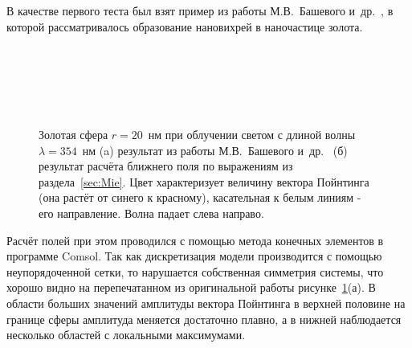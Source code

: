 В качестве первого теста был взят пример из работы М.В.~Башевого
и~др.~\cite{Bashevoy-2005}, в которой рассматривалось образование
нановихрей в наночастице золота. 
\begin{figure}[p]
  \begin{minipage}[ht]{0.99\linewidth}
  \end{minipage}\\
  \vfill
  \begin{minipage}[ht]{0.99\linewidth}
  \end{minipage}\\
  \vfill
  \begin{minipage}[ht]{0.99\linewidth}
  \end{minipage}\\
  \begin{minipage}[ht]{0.99\linewidth}
  \end{minipage}
  \caption{Золотая сфера $r=20$~нм при облучении светом с длиной волны
    $\lambda=354$~нм (a) результат из работы М.В.~Башевого
    и~др.~\cite{Bashevoy-2005} (б) результат расчёта ближнего поля по
    выражениям из раздела~\ref{sec:Mie}. Цвет характеризует величину
    вектора Пойнтинга (она растёт от синего к красному), касательная к
    белым линиям - его направление. Волна падает слева
    направо.\label{img:vortex}}
\end{figure}
Расчёт полей при этом проводился с помощью метода конечных элементов в
программе Comsol. Так как дискретизация модели производится с помощью
неупорядоченной сетки, то нарушается собственная симметрия системы,
что хорошо видно на перепечатанном из оригинальной работы
рисунке~\ref{img:vortex}(а).  В области больших значений амплитуды
вектора Пойнтинга в верхней половине на границе сферы амплитуда
меняется достаточно плавно, а в нижней наблюдается несколько областей
с локальными максимумами.

